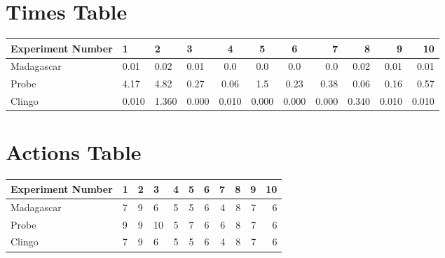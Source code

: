 \documentclass[8pt]{article}
\begin{document}
\begin{landscape}
\section{Times Table}\begin{tabular}{ | l | l | l | l | c | c | c | r | r | r | r | }\hline
Experiment Number & 1 & 2 & 3 & 4 & 5 & 6 & 7 & 8 & 9 & 10\\  \hline
Madagascar & 0.01 & 0.02 & 0.01 & 0.0 & 0.0 & 0.0 & 0.0 & 0.02 & 0.01 & 0.01\\  \hline
Probe & 4.17 & 4.82 & 0.27 & 0.06 & 1.5 & 0.23 & 0.38 & 0.06 & 0.16 & 0.57\\  \hline
Clingo & 0.010 & 1.360 & 0.000 & 0.010 & 0.000 & 0.000 & 0.000 & 0.340 & 0.010 & 0.010\\  \hline
\end{tabular}
\section{Actions Table}\begin{tabular}{ | l | l | l | l | c | c | c | r | r | r | r | }\hline
Experiment Number & 1 & 2 & 3 & 4 & 5 & 6 & 7 & 8 & 9 & 10\\ \hline
 Madagascar & 7 & 9 & 6 & 5 & 5 & 6 & 4 & 8 & 7 & 6\\ \hline
 Probe & 9 & 9 & 10 & 5 & 7 & 6 & 6 & 8 & 7 & 6\\ \hline
 Clingo & 7 & 9 & 6 & 5 & 5 & 6 & 4 & 8 & 7 & 6\\ \hline
\end{tabular}
\end{landscape}
\end{document}
